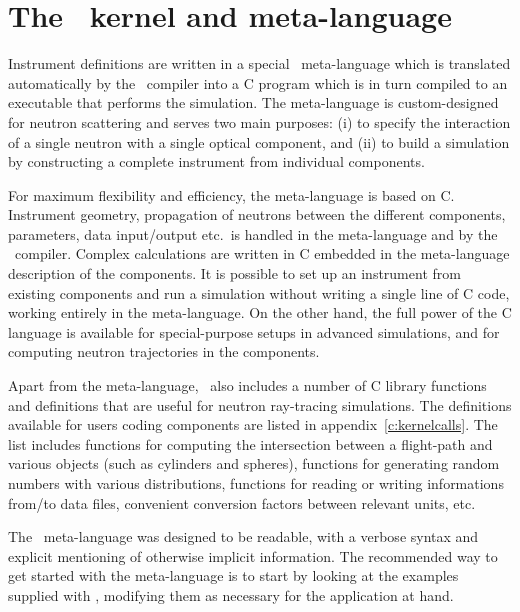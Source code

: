 
\chapter{The \MCS\ kernel and meta-language}
\label{s:kernel}

Instrument definitions are written in a special \MCS\ meta-language which
is translated automatically by the \MCS\ compiler into a C program 
which is in turn compiled to an executable that
performs the simulation. The meta-language is custom-designed for neutron
scattering and serves two main purposes: (i) to specify the interaction of a
single neutron with a single optical component, and (ii) to build a
simulation by constructing a complete instrument from individual
components.

For maximum flexibility and efficiency, the meta-language is based on C.
Instrument geometry, propagation of neutrons between the different
components, parameters, data input/output etc.\ is handled in the
meta-language and by the \MCS\ compiler. Complex calculations are written in
C embedded in the meta-language description of the components. It is
possible to set up an instrument from existing components and
run a simulation without writing a single line of C code, working
entirely in the meta-language. On the other hand, the full power of the C
language is available for special-purpose setups in advanced
simulations, and for computing neutron trajectories in the components.

Apart from the meta-language, \MCS\ also includes a number of C library
functions and definitions that are useful for neutron ray-tracing
simulations. The definitions available for users coding components are
listed in appendix~\ref{c:kernelcalls}. The list includes functions for
computing the intersection between a flight-path and various objects
(such as cylinders and spheres), functions for generating random numbers
with various distributions, functions for reading or writing
informations from/to data files, convenient conversion
factors between relevant units, etc. 

The \MCS\ meta-language was designed to be readable, with a verbose
syntax and explicit mentioning of otherwise implicit information. The
recommended way to get started with the meta-language is to start by
looking at the examples supplied with \MCS, modifying them as necessary
for the application at hand.

